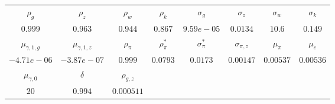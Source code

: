 \begin{tabular}{cccccccc} \\ \hline$\rho_g$&$\rho_z$&$\rho_w$&$\rho_k$&$\sigma_g$&$\sigma_z$&$\sigma_w$&$\sigma_k$\\$0.999$&$0.963$&$0.944$&$0.867$&$9.59e-05$&$0.0134$&$10.6$&$0.149$\\ \hline$\mu_{\gamma,1,g}$&$\mu_{\gamma,1,z}$&$\rho_\pi$&$\rho_{\pi}^*$&$\sigma_{\pi}^*$&$\sigma_{\pi,z}$&$\mu_\pi$&$\mu_c$\\$-4.71e-06$&$-3.87e-07$&$0.999$&$0.0793$&$0.0173$&$0.00147$&$0.00537$&$0.00536$\\ \hline$\mu_{\gamma,0}$&$\delta$&$\rho_{g,z}$\\$20$&$0.994$&$0.000511$\\ \hline \end{tabular}